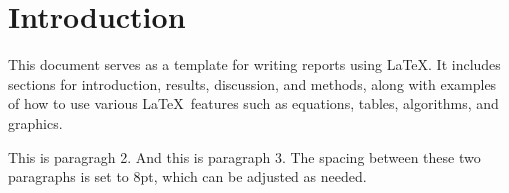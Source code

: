 \pagestyle{fancy}
\fancyhf{}
\fancyfoot[C]{\thepage}
\renewcommand{\headrulewidth}{0pt}
\renewcommand{\footrulewidth}{0pt}

\setcounter{page}{2}
\section{Introduction}
This document serves as a template for writing reports using \LaTeX. It includes sections for introduction, results, discussion, and methods, along with examples of how to use various \LaTeX\ features such as equations, tables, algorithms, and graphics.

This is paragragh 2. And this is paragraph 3. The spacing between these two paragraphs is set to 8pt, which can be adjusted as needed.


